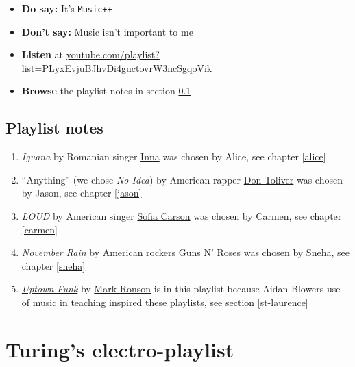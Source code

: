 \documentclass[
]{book}
\providecommand{\tightlist}{%
  \setlength{\itemsep}{0pt}\setlength{\parskip}{0pt}}
\begin{document}
\begin{itemize}
\tightlist
\item
  \textbf{Do say:} It's \texttt{Music++}
\item
  \textbf{Don't say:} Music isn't important to me
\item
  \textbf{Listen} at \href{https://youtube.com/playlist?list=PLyxEvjuBJhvDi4guctovrW3ncSgqoVik_}{youtube.com/playlist?list=PLyxEvjuBJhvDi4guctovrW3ncSgqoVik\_}
\item
  \textbf{Browse} the playlist notes in section \ref{codersnotes}
\end{itemize}

\hypertarget{codersnotes}{%
\subsection{Playlist notes}\label{codersnotes}}

\begin{enumerate}
\def\labelenumi{\arabic{enumi}.}
\tightlist
\item
  \emph{Iguana} by Romanian singer \href{https://en.wikipedia.org/wiki/Inna}{Inna} was chosen by Alice, see chapter \ref{alice}
\item
  ``Anything'' (we chose \emph{No Idea}) by American rapper \href{https://en.wikipedia.org/wiki/Don_Toliver}{Don Toliver} was chosen by Jason, see chapter \ref{jason}\\
\item
  \emph{LOUD} by American singer \href{https://en.wikipedia.org/wiki/Sofia_Carson}{Sofia Carson} was chosen by Carmen, see chapter \ref{carmen}
\item
  \emph{\href{https://en.wikipedia.org/wiki/November_Rain}{November Rain}} by American rockers \href{https://en.wikipedia.org/wiki/Guns_N\%27_Roses}{Guns N' Roses} was chosen by Sneha, see chapter \ref{sneha}
\item
  \emph{\href{https://en.wikipedia.org/wiki/Uptown_Funk}{Uptown Funk}} by \href{https://en.wikipedia.org/wiki/Mark_Ronson}{Mark Ronson} \citep{uptownfunk} is in this playlist because Aidan Blowers use of music in teaching inspired these playlists, see section \ref{st-laurence}
\end{enumerate}

\hypertarget{electronica}{%
\section{Turing's electro-playlist}\label{electronica}}
\end{document}
